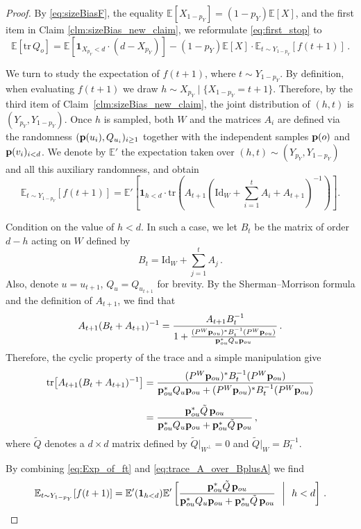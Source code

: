\documentclass[reqno,english]{amsart}
\numberwithin{equation}{section}
\theoremstyle{definition}{
\newtheorem{example}[theorem]{Example}
\newtheorem{definition}[theorem]{Definition}
\newtheorem*{definition*}{Definition}
\newtheorem{problem}[theorem]{Problem}
\newtheorem{question}[theorem]{Question}
}
\newcommand{\E}{\mathbb E}
\newcommand{\p}{{\bf p}}
\newcommand{\tr}{{\mathrm {tr}}}
\newcommand{\Id}{\mathrm{Id}}
\begin{document}
\begin{proof}
By \eqref{eq:sizeBiasF}, the equality $\E[X_{1-p_Y}]=(1-p_Y)\E[X]$, and the first item in Claim \ref{clm:sizeBias_new_claim}, we reformulate \eqref{eq:first_stop} to
\begin{equation}\label{eq:ft}
\E[\tr\,Q_o]=\E[\mathbf 1_{X_{p_Y}<d}\cdot (d-X_{p_Y})]- 
(1-p_Y)\E[X]\cdot\E_{t\sim Y_{1-p_Y}}\left[f(t+1) \right]\,.    
\end{equation}

We turn to study the expectation of $f(t+1)$, where $t\sim Y_{1-p_Y}$. 
By definition, when evaluating $f(t+1)$ we draw
$h\sim X_{p_Y}\mid \{X_{1-p_Y}=t+1\}$. Therefore, by the third item of
Claim~\ref{clm:sizeBias_new_claim}, the joint distribution of $(h,t)$ is
$(Y_{p_Y},Y_{1-p_Y})$. Once $h$ is sampled, both $W$ and the matrices $A_i$ are defined via the randomness $(\p(u_i),Q_{u_i})_{i\ge 1}$ together with the independent samples $\p(o)$ and $\p(v_i)_{i<d}$. We denote by $\E'$ the expectation taken over $(h,t)\sim(Y_{p_Y},Y_{1-p_Y})$ and all this auxiliary randomness, and obtain
\begin{equation}\label{eq:Exp_of_ft}
    \E_{t\sim Y_{1-p_Y}}\!\left[f(t+1) \right]
    = \E'\!\left[ 
        \mathbf{1}_{h<d}\cdot 
\tr\!\left(A_{t+1} \left(\Id_W + \sum_{i=1}^{t}A_i+A_{t+1}\right)^{-1}\right)
    \right].
\end{equation}

Condition on the value of $h<d$. In such a case, we let $B_t$ be the matrix of order $d-h$ acting on $W$ defined by 
$$B_t=\Id_W + \sum_{j=1}^{t}A_j\,.$$ Also, denote $u=u_{t+1}$, $Q_u=Q_{u_{t+1}}$ for brevity. By the Sherman--Morrison formula and the definition of $A_{t+1}$, we find that
\[
A_{t+1}(B_t+A_{t+1})^{-1} = \frac{A_{t+1}B_t^{-1}}{1+\frac{(P^W\p_{ou})^*B_t^{-1}(P^W\p_{ou})}{\p_{ou}^*Q_{u}\p_{ou}}}\,.
\]
Therefore, the cyclic property of the trace and a simple manipulation give
\begin{align}
\tr\!\left[A_{t+1}(B_t+A_{t+1})^{-1}\right]
&= \frac{(P^W\p_{ou})^*B_t^{-1}(P^W\p_{ou})}{\p_{ou}^*Q_{u}\p_{ou}+(P^W\p_{ou})^*B_t^{-1}(P^W\p_{ou})} \nonumber\\[0.6em]
&= \frac{\p_{ou}^*\tilde Q\,\p_{ou}}{\p_{ou}^*Q_{u}\p_{ou}+\p_{ou}^*\tilde Q\,\p_{ou}}\,, \label{eq:trace_A_over_BplusA}
\end{align}
where $\tilde Q$ denotes a $d\times d$ matrix defined by $\tilde Q|_{W^\perp}=0$ and $\tilde Q|_W = B_t^{-1}$.

By combining \eqref{eq:Exp_of_ft} and \eqref{eq:trace_A_over_BplusA} we find
\begin{equation}\label{eq:almost_there}
\E_{t\sim Y_{1-p_Y}}[f(t+1)]=\E'(\mathbf 1_{h<d})\E'\left[ \frac{\p_{ou}^*\tilde Q\,\p_{ou}}{\p_{ou}^*Q_{u}\p_{ou}+\p_{ou}^*\tilde Q\,\p_{ou}} ~~\middle |~~ h<d \right]\,.  
\end{equation}


\end{proof}
\end{document}
